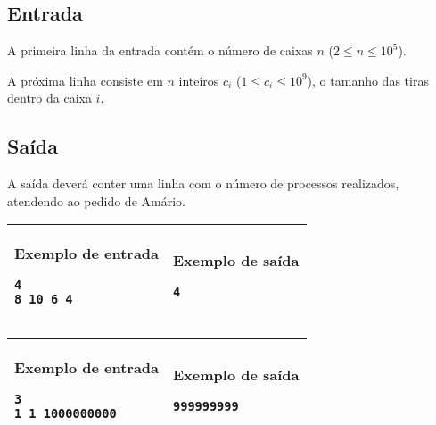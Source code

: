\subsection*{Entrada}
 
A primeira linha da entrada contém o número de caixas $n$ ($2\leq n\leq 10^5$).
 
A próxima linha consiste em $n$ inteiros $c_i$ ($1\leq c_i \leq 10^9$), o tamanho das tiras dentro da caixa $i$.
 
\subsection*{Saída}
A saída deverá conter uma linha com o número de processos realizados, atendendo ao pedido de Amário. 

\newpage
\begin{table}[!h]
\centering
\hspace{-2cm}
\begin{tabular}{|l|l|}
\hline
\begin{minipage}[t]{5.5in}
\textbf{Exemplo de entrada}
\begin{verbatim}
4
8 10 6 4
\end{verbatim}
\vspace{1mm}
\end{minipage}
&
\begin{minipage}[t]{1.5in}
\textbf{Exemplo de saída}
\begin{verbatim}
4
\end{verbatim}
\vspace{1mm}
\end{minipage} \\
\hline
\end{tabular}
\end{table}

\begin{table}[!h]
\centering
\hspace{-2cm}
\begin{tabular}{|l|l|}
\hline
\begin{minipage}[t]{5.5in}
\textbf{Exemplo de entrada}
\begin{verbatim}
3
1 1 1000000000
\end{verbatim}
\vspace{1mm}
\end{minipage}
&
\begin{minipage}[t]{1.5in}
\textbf{Exemplo de saída}
\begin{verbatim}
999999999
\end{verbatim}
\vspace{1mm}
\end{minipage} \\
\hline
\end{tabular}
\end{table}
